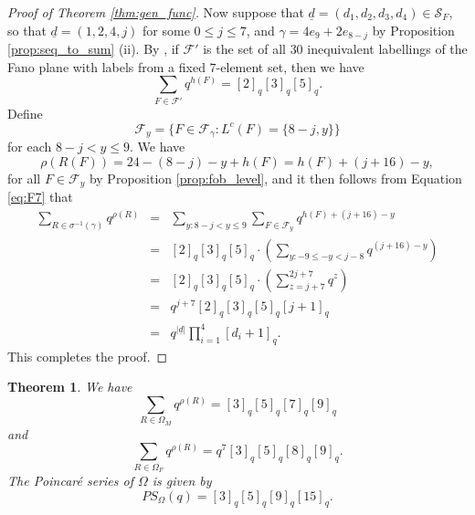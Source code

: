 \documentclass[11pt]{amsart}
\theoremstyle{plain}
\newtheorem{theorem}{Theorem}[section]
\theoremstyle{definition}
\theoremstyle{remark}
\numberwithin{equation}{section}
\newcommand{\lc}{L^c}
\newcommand{\seqd}{\underline{d}}
\newcommand{\calf}{\mathcal{F}}
\newcommand{\cals}{\mathcal{S}}
\newcommand{\ob}{\Omega}
\newcommand{\fob}{\Omega_F}
\newcommand{\mob}{\Omega_M}
\newcommand{\inverse}{^{-1}}
\newcommand{\abs}[1]{\lvert #1 \rvert}
\begin{document}
\begin{proof}[Proof of Theorem \ref{thm:gen_func}]
Now suppose that $\seqd=(d_1,d_2,d_3,d_4)\in \cals_F$, so that $\seqd=(1,2,4,j)$ for some
$0\le j\le 7$, and $\gamma=4e_9+2e_{8-j}$ by Proposition \ref{prop:seq_to_sum}
(ii). By \cite[Proposition 3.7, Proposition 4.12]{the240}, if $\calf'$ is the
set of all $30$ inequivalent labellings of the Fano plane with labels from a
fixed $7$-element set, then we have 
\begin{equation}
\label{eq:F7}
\sum_{F \in \calf'} q^{h(F)} = [2]_q [3]_q [5]_q.
\end{equation}
Define
\[
  \calf_y=\{F\in \calf_\gamma: \lc(F)=\{8-j,y\}\}
\]
for each $8-j<y\le 9$. We have
\[
\rho(R(F))=24-(8-j)-y+h(F)=h(F)+(j+16)-y,
\]
for all $F\in \calf_y$
by Proposition \ref{prop:fob_level}, and it then follows from Equation \eqref{eq:F7} that 
\begin{eqnarray*}
  \sum_{R\in \sigma\inverse(\gamma)}q^{\rho(R)}&=& \sum_{y:8-j<y\le 9}\sum_{F\in
  \calf_y}q^{h(F)+(j+16)-y}\\  
                                               &=& [2]_q [3]_q [5]_q\cdot \left(\sum_{y:-9\le -y< {j-8}}
  q^{(j+16)-y}\right)\\
                  &=& [2]_q [3]_q [5]_q\cdot  \left(\sum_{z=j+7}^{2j+7} q^{z}\right) \\ &= &q^{j+7}
[2]_q [3]_q [5]_q [j+1]_q\\ & = & q^{\abs{\seqd}}\prod_{i=1}^4 [d_i+1]_q.
\end{eqnarray*} 
This completes the proof. \end{proof}

\begin{theorem}
\label{thm:endgame}
We have
\begin{equation}
\label{eq:mob_gen}
\sum_{R\in \mob}q^{\rho(R)}=[3]_q[5]_q[7]_q[9]_q
\end{equation}
and 
\begin{equation}
\label{eq:fob_gen}
\sum_{R\in \fob}q^{\rho(R)}=q^7[3]_q[5]_q[8]_q[9]_q.
\end{equation}
The Poincar\'e series of $\ob$ is given by 
\[
PS_\ob(q)=[3]_q[5]_q[9]_q[15]_q.
\]
\end{theorem}
\end{document}
